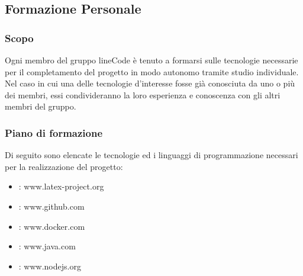 
\subsection{Formazione Personale}

	\subsubsection{Scopo}
	Ogni membro del gruppo lineCode è tenuto a formarsi sulle tecnologie necessarie per il completamento del progetto in modo autonomo tramite studio individuale. Nel caso in cui una delle tecnologie d'interesse fosse già conosciuta da uno o più dei membri, essi condivideranno la loro esperienza e conoscenza con gli altri membri del gruppo.

	\subsubsection{Piano di formazione}
	Di seguito sono elencate le tecnologie ed i linguaggi di programmazione necessari per la realizzazione del progetto:
	\begin{itemize}
		\item \glock{\LaTeX} : www.latex-project.org
		\item {} : www.github.com
		\item {} : www.docker.com
		\item {} : www.java.com
		\item {} : www.nodejs.org
	\end{itemize}

